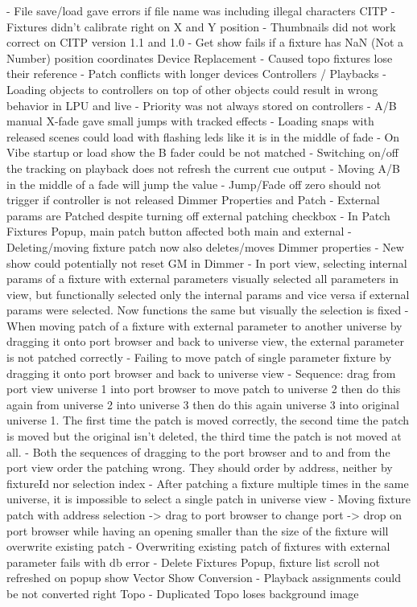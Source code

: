 \documentclass[
]{article}
\begin{document}
- File save/load gave errors if file name was including illegal characters CITP
- Fixtures didn't calibrate right on X and Y position
- Thumbnails did not work correct on CITP version 1.1 and 1.0
- Get show fails if a fixture has NaN (Not a Number) position coordinates
Device Replacement
- Caused topo fixtures lose their reference
- Patch conflicts with longer devices
Controllers / Playbacks
- Loading objects to controllers on top of other objects could result in wrong behavior in LPU and live
- Priority was not always stored on controllers
- A/B manual X-fade gave small jumps with tracked effects
- Loading snaps with released scenes could load with flashing leds like it is in the middle of fade
- On Vibe startup or load show the B fader could be not matched
- Switching on/off the tracking on playback does not refresh the current cue output
- Moving A/B in the middle of a fade will jump the value
- Jump/Fade off zero should not trigger if controller is not released
Dimmer Properties and Patch
- External params are Patched despite turning off external patching checkbox
- In Patch Fixtures Popup, main patch button affected both main and external
- Deleting/moving fixture patch now also deletes/moves Dimmer properties
- New show could potentially not reset GM in Dimmer
- In port view, selecting internal params of a fixture with external parameters visually selected all parameters in view, but functionally selected only the internal params and vice versa if external params were selected. Now functions the same but visually the selection is fixed
- When moving patch of a fixture with external parameter to another universe by dragging it onto port browser and back to universe view, the external parameter is not patched correctly
- Failing to move patch of single parameter fixture by dragging it onto port browser and back to universe view
- Sequence: drag from port view universe 1 into port browser to move patch to universe 2 then do this again from universe 2 into universe 3 then do this again universe 3 into original universe 1. The first time the patch is moved correctly, the second time the patch is moved but the original isn't deleted, the third time the patch is not moved at all.
- Both the sequences of dragging to the port browser and to and from the port view order the patching wrong. They should order by address, neither by fixtureId nor selection index
- After patching a fixture multiple times in the same universe, it is impossible to select a single patch in universe view
- Moving fixture patch with address selection -\textgreater{} drag to port browser to change port -\textgreater{} drop on port browser while having an opening smaller than the size of the fixture will overwrite existing patch
- Overwriting existing patch of fixtures with external parameter fails with db error
- Delete Fixtures Popup, fixture list scroll not refreshed on popup show
Vector Show Conversion
- Playback assignments could be not converted right
Topo
- Duplicated Topo loses background image
\end{document}
